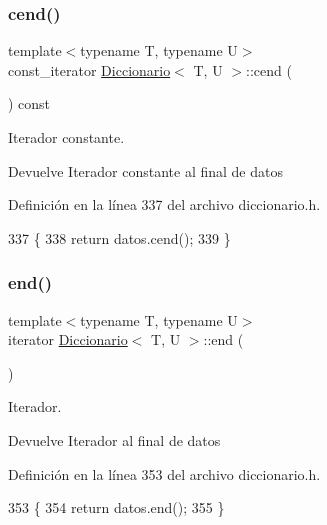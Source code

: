\subsubsection{\texorpdfstring{cend()}{cend()}}
{\footnotesize\ttfamily template$<$typename T, typename U$>$ \\
const\+\_\+iterator \hyperlink{classDiccionario}{Diccionario}$<$ T, U $>$\+::cend (\begin{DoxyParamCaption}{ }\end{DoxyParamCaption}) const\hspace{0.3cm}{\ttfamily [inline]}}



Iterador constante. 

\begin{DoxyReturn}{Devuelve}
Iterador constante al final de datos 
\end{DoxyReturn}


Definición en la línea 337 del archivo diccionario.\+h.


\begin{DoxyCode}
337                                 \{
338         \textcolor{keywordflow}{return} datos.cend();
339     \}
\end{DoxyCode}
\mbox{\label{classDiccionario_adb5cdbfce59b4005bd07473273df3a8e}} 
\subsubsection{\texorpdfstring{end()}{end()}}
{\footnotesize\ttfamily template$<$typename T, typename U$>$ \\
iterator \hyperlink{classDiccionario}{Diccionario}$<$ T, U $>$\+::end (\begin{DoxyParamCaption}{ }\end{DoxyParamCaption})\hspace{0.3cm}{\ttfamily [inline]}}



Iterador. 

\begin{DoxyReturn}{Devuelve}
Iterador al final de datos 
\end{DoxyReturn}


Definición en la línea 353 del archivo diccionario.\+h.


\begin{DoxyCode}
353                    \{
354         \textcolor{keywordflow}{return} datos.end();
355     \}
\end{DoxyCode}
\mbox{\label{classDiccionario_a16314351b0600835ade3c7add2ffe040}} 
